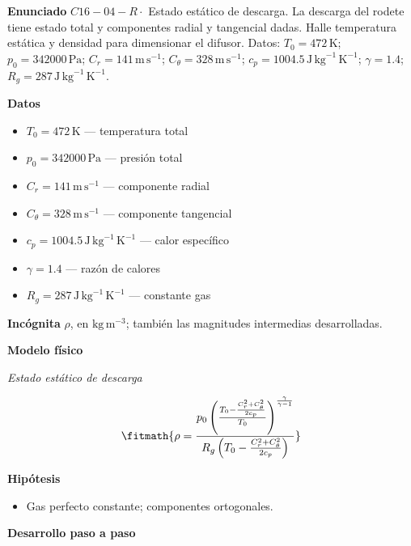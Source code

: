 \documentclass[10pt,openany]{book}
\begin{document}
\begin{tcolorbox}[title={Problema resuelto 4}, studiumworked, breakable]

\noindent\textbf{Enunciado}
\(C16-04-R \cdot\) Estado estático de descarga. La descarga del rodete tiene estado total y componentes radial y tangencial dadas. Halle temperatura estática y densidad para dimensionar el difusor. Datos: \(T_0=472\, \mathrm{K}\); \(p_0=342000\, \mathrm{Pa}\); \(C_r=141\, \mathrm{m}\,\mathrm{s}^{-1}\); \(C_\theta=328\, \mathrm{m}\,\mathrm{s}^{-1}\); \(c_p=1004.5\, \mathrm{J}\,\mathrm{kg}^{-1}\,\mathrm{K}^{-1}\); \(\gamma=1.4\); \(R_g=287\, \mathrm{J}\,\mathrm{kg}^{-1}\,\mathrm{K}^{-1}\).

\noindent\textbf{Datos}
\begin{itemize}
\item $T_0 = 472\,\mathrm{K}$ — temperatura total
\item $p_0 = 342000\,\mathrm{Pa}$ — presión total
\item $C_r = 141\,\mathrm{m}\,\mathrm{s}^{-1}$ — componente radial
\item $C_\theta = 328\,\mathrm{m}\,\mathrm{s}^{-1}$ — componente tangencial
\item $c_p = 1004.5\,\mathrm{J}\,\mathrm{kg}^{-1}\,\mathrm{K}^{-1}$ — calor específico
\item $\gamma = 1.4$ — razón de calores
\item $R_g = 287\,\mathrm{J}\,\mathrm{kg}^{-1}\,\mathrm{K}^{-1}$ — constante gas
\end{itemize}

\noindent\textbf{Incógnita}
$\rho$, en $\mathrm{kg\,m^{-3}}$; también las magnitudes intermedias desarrolladas.

\noindent\textbf{Modelo físico}

\noindent\textit{Estado estático de descarga}

\[
\fitmath{\rho=\frac{p_0 \left(\frac{T_0 - \frac{C_r^{2} + C_\theta^{2}}{2 c_p}}{T_0}\right)^{\frac{\gamma}{\gamma - 1}}}{R_g \left(T_0 - \frac{C_r^{2} + C_\theta^{2}}{2 c_p}\right)}}
\]

\noindent\textbf{Hipótesis}
\begin{itemize}
\item Gas perfecto constante; componentes ortogonales.
\end{itemize}

\noindent\textbf{Desarrollo paso a paso}




\end{tcolorbox}
\end{document}
